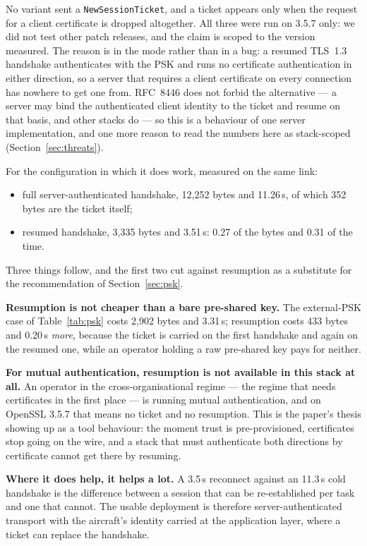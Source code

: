 \documentclass[drones,article,submit,pdftex,moreauthors]{Definitions/mdpi}
\newcommand{\tls}{TLS}
\begin{document}
\noindent No variant sent a \texttt{NewSessionTicket}, and a ticket
appears only when the request for a client certificate is dropped
altogether. All three were run on 3.5.7 only: we did not test other
patch releases, and the claim is scoped to the version measured. The
reason is in the mode rather than in a bug: a resumed
\tls{}~1.3 handshake authenticates with the PSK and runs no certificate
authentication in either direction, so a server that requires a client
certificate on every connection has nowhere to get one from. RFC~8446
\cite{rfc8446} does not forbid the alternative --- a server may bind the
authenticated
client identity to the ticket and resume on that basis, and other stacks
do --- so this is a behaviour of one server implementation, and one more
reason to read the numbers here as stack-scoped
(Section~\ref{sec:threats}).

For the configuration in which it does work, measured on the same link:

\begin{itemize}
\item full server-authenticated handshake, 12{,}252 bytes and 11.26\,s,
      of which 352 bytes are the ticket itself;
\item resumed handshake, 3{,}335 bytes and 3.51\,s: 0.27 of the bytes
      and 0.31 of the time.
\end{itemize}

Three things follow, and the first two cut against resumption as a
substitute for the recommendation of Section~\ref{sec:psk}.

\textbf{Resumption is not cheaper than a bare pre-shared key.} The
external-PSK case of Table~\ref{tab:psk} costs 2{,}902 bytes and
3.31\,s; resumption costs 433 bytes and 0.20\,s \emph{more}, because
the ticket is carried on the first handshake and again on the resumed
one, while an operator holding a raw pre-shared key pays for neither.

\textbf{For mutual authentication, resumption is not available in this
stack at all.} An operator in the cross-organisational regime --- the
regime that needs certificates in the first place --- is running mutual
authentication, and on OpenSSL 3.5.7 that means no ticket and no
resumption. This is the paper's thesis showing up as a tool behaviour:
the moment trust is pre-provisioned, certificates stop going on the
wire, and a stack that must authenticate both directions by certificate
cannot get there by resuming.

\textbf{Where it does help, it helps a lot.} A 3.5\,s reconnect against
an 11.3\,s cold handshake is the difference between a session that can
be re-established per task and one that cannot. The usable deployment
is therefore server-authenticated transport with the aircraft's identity
carried at the application layer, where a ticket can replace the
handshake.
\end{document}
